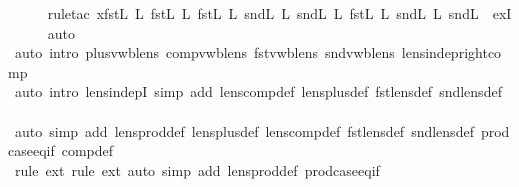 \begin{isabellebody}
\ \ \ \ \isamarkupfalse%
\ {\isacharparenleft}rule{\isacharunderscore}tac\ x{\isacharequal}{\isachardoublequoteopen}{\isacharparenleft}{\isacharparenleft}fst\isactrlsub L\ {\isacharsemicolon}\isactrlsub L\ fst\isactrlsub L{\isacharparenright}\ {\isacharplus}\isactrlsub L\ {\isacharparenleft}fst\isactrlsub L\ {\isacharsemicolon}\isactrlsub L\ snd\isactrlsub L{\isacharparenright}{\isacharparenright}\ {\isacharplus}\isactrlsub L\ {\isacharparenleft}{\isacharparenleft}snd\isactrlsub L\ {\isacharsemicolon}\isactrlsub L\ fst\isactrlsub L{\isacharparenright}\ {\isacharplus}\isactrlsub L\ {\isacharparenleft}snd\isactrlsub L\ {\isacharsemicolon}\isactrlsub L\ snd\isactrlsub L{\isacharparenright}{\isacharparenright}{\isachardoublequoteclose}\ \ exI{\isacharparenright}\isanewline
\ \ \ \ \isamarkupfalse%
\ {\isacharparenleft}auto{\isacharparenright}\isanewline
\ \ \ \ \isamarkupfalse%
\ {\isacharparenleft}auto\ intro{\isacharbang}{\isacharcolon}\ plus{\isacharunderscore}vwb{\isacharunderscore}lens\ comp{\isacharunderscore}vwb{\isacharunderscore}lens\ fst{\isacharunderscore}vwb{\isacharunderscore}lens\ snd{\isacharunderscore}vwb{\isacharunderscore}lens\ lens{\isacharunderscore}indep{\isacharunderscore}right{\isacharunderscore}comp{\isacharparenright}\isanewline
\ \ \ \ \isamarkupfalse%
\ {\isacharparenleft}auto\ intro{\isacharbang}{\isacharcolon}\ lens{\isacharunderscore}indepI\ simp\ add{\isacharcolon}\ lens{\isacharunderscore}comp{\isacharunderscore}def\ lens{\isacharunderscore}plus{\isacharunderscore}def\ fst{\isacharunderscore}lens{\isacharunderscore}def\ snd{\isacharunderscore}lens{\isacharunderscore}def{\isacharparenright}\isanewline
\ \ \ \ \isamarkupfalse%
\ {\isacharparenleft}auto\ simp\ add{\isacharcolon}\ lens{\isacharunderscore}prod{\isacharunderscore}def\ lens{\isacharunderscore}plus{\isacharunderscore}def\ lens{\isacharunderscore}comp{\isacharunderscore}def\ fst{\isacharunderscore}lens{\isacharunderscore}def\ snd{\isacharunderscore}lens{\isacharunderscore}def\ prod{\isachardot}case{\isacharunderscore}eq{\isacharunderscore}if\ comp{\isacharunderscore}def{\isacharparenright}{\isacharbrackleft}{}{\isacharbrackright}\isanewline
\ \ \ \ \isamarkupfalse%
\ {\isacharparenleft}rule\ ext{\isacharcomma}\ rule\ ext{\isacharcomma}\ auto\ simp\ add{\isacharcolon}\ lens{\isacharunderscore}prod{\isacharunderscore}def\ prod{\isachardot}case{\isacharunderscore}eq{\isacharunderscore}if{\isacharparenright}\isanewline
\ \ \isamarkupfalse%

\end{isabellebody}
